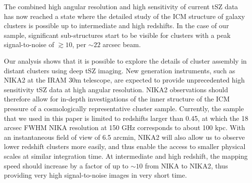 \documentclass[twocolumn,traditabstract]{aa}
\begin{document}
The combined high angular resolution and high sensitivity of current tSZ data has now reached a state where the detailed study of the ICM structure of galaxy clusters is possible up to intermediate and high redshifts. In the case of our sample, significant sub-structures start to be visible for clusters with a peak signal-to-noise of $\gtrsim 10$, per $\sim 22$ arcsec beam.

Our analysis shows that it is possible to explore the details of cluster assembly in distant clusters using deep tSZ imaging. New generation instruments, such as NIKA2 \citep{Calvo2016,Catalano2016,NIKA2017} at the IRAM 30m telescope, are expected to provide unprecedented high sensitivity tSZ data at high angular resolution. NIKA2 observations \citep[such as the ones of the tSZ large program,][]{Comis2016,Mayet2017} should therefore allow for in-depth investigations of the inner structure of the ICM pressure of a cosmologically representative cluster sample. Currently, the sample that we used in this paper is limited to redshifts larger than 0.45, at which the 18 arcsec FWHM NIKA resolution at 150 GHz corresponds to about 100 kpc. With an instantaneous field of view of 6.5 arcmin, NIKA2 will also allow us to observe lower redshift clusters more easily, and thus enable the access to smaller physical scales at similar integration time. At intermediate and high redshift, the mapping speed should increase by a factor of up to $\sim 10$ from NIKA to NIKA2, thus providing very high signal-to-noise images in very short time.
\end{document}
